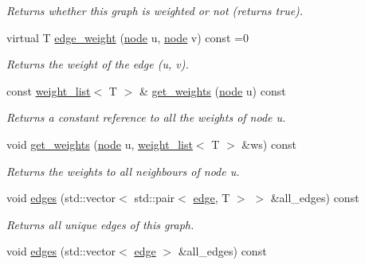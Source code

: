 \begin{DoxyCompactItemize}
\begin{DoxyCompactList}\small\item\em Returns whether this graph is weighted or not (returns true). \end{DoxyCompactList}\item 
virtual T \hyperlink{classlgraph_1_1wxgraph_af5e23332680fdecb6db2fac3b3137982}{edge\-\_\-weight} (\hyperlink{namespacelgraph_a397169dd66adf725210a30fb7251773e}{node} u, \hyperlink{namespacelgraph_a397169dd66adf725210a30fb7251773e}{node} v) const =0
\begin{DoxyCompactList}\small\item\em Returns the weight of the edge ({\itshape u}, {\itshape v}). \end{DoxyCompactList}\item 
const \hyperlink{namespacelgraph_a1e0fd5ef0a78b2a92da48adbed265cb6}{weight\-\_\-list}$<$ T $>$ \& \hyperlink{classlgraph_1_1wxgraph_a466944795f3d3399a633bd3ea5d3700b}{get\-\_\-weights} (\hyperlink{namespacelgraph_a397169dd66adf725210a30fb7251773e}{node} u) const 
\begin{DoxyCompactList}\small\item\em Returns a constant reference to all the weights of node {\itshape u}. \end{DoxyCompactList}\item 
void \hyperlink{classlgraph_1_1wxgraph_a17e6e4f50473631e789631efc029f1ea}{get\-\_\-weights} (\hyperlink{namespacelgraph_a397169dd66adf725210a30fb7251773e}{node} u, \hyperlink{namespacelgraph_a1e0fd5ef0a78b2a92da48adbed265cb6}{weight\-\_\-list}$<$ T $>$ \&ws) const 
\begin{DoxyCompactList}\small\item\em Returns the weights to all neighbours of node {\itshape u}. \end{DoxyCompactList}\item 
void \hyperlink{classlgraph_1_1wxgraph_aed7f8e1486d9e2352fc1891521913b4f}{edges} (std\-::vector$<$ std\-::pair$<$ \hyperlink{namespacelgraph_a76bd7d50719f03de7a85db259d80d572}{edge}, T $>$ $>$ \&all\-\_\-edges) const 
\begin{DoxyCompactList}\small\item\em Returns all unique edges of this graph. \end{DoxyCompactList}\item 
void \hyperlink{classlgraph_1_1wxgraph_a3bbf2166098254bff81889f42a334b4e}{edges} (std\-::vector$<$ \hyperlink{namespacelgraph_a76bd7d50719f03de7a85db259d80d572}{edge} $>$ \&all\-\_\-edges) const 

\end{DoxyCompactItemize}
